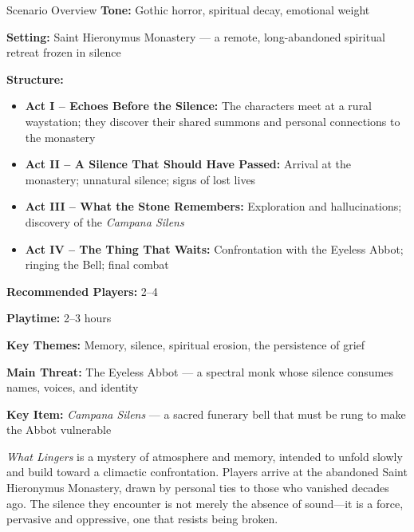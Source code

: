 \documentclass[twocolumn,nodeprecatedcode,bg=print]{dndbook/dndbook}
\begin{document}
\begin{WyrdSidebar}[float=!b]{Scenario Overview}
    \textbf{Tone:} Gothic horror, spiritual decay, emotional weight
    
    \noindent
    \textbf{Setting:} Saint Hieronymus Monastery — a remote, long-abandoned spiritual retreat frozen in silence
    
    \noindent
    \textbf{Structure:}
    \begin{itemize}
        \item \textbf{Act I – Echoes Before the Silence:} The characters meet at a rural waystation; they discover their shared summons and personal connections to the monastery
        \item \textbf{Act II – A Silence That Should Have Passed:} Arrival at the monastery; unnatural silence; signs of lost lives
        \item \textbf{Act III – What the Stone Remembers:} Exploration and hallucinations; discovery of the \emph{Campana Silens}
        \item \textbf{Act IV – The Thing That Waits:} Confrontation with the Eyeless Abbot; ringing the Bell; final combat
    \end{itemize}
    
    \noindent
    \textbf{Recommended Players:} 2–4
    
    \noindent
    \textbf{Playtime:} 2–3 hours
    
    \noindent
    \textbf{Key Themes:} Memory, silence, spiritual erosion, the persistence of grief
    
    \noindent
    \textbf{Main Threat:} The Eyeless Abbot — a spectral monk whose silence consumes names, voices, and identity
    
    \noindent
    \textbf{Key Item:} \emph{Campana Silens} — a sacred funerary bell that must be rung to make the Abbot vulnerable
\end{WyrdSidebar}
    
\emph{What Lingers} is a mystery of atmosphere and memory, intended to unfold slowly and build toward a climactic confrontation. Players arrive at the abandoned Saint Hieronymus Monastery, drawn by personal ties to those who vanished decades ago. The silence they encounter is not merely the absence of sound—it is a force, pervasive and oppressive, one that resists being broken.
\end{document}
